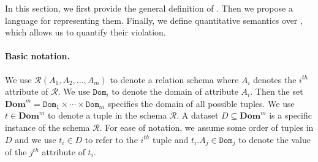 
\def\Inv{\mathtt{Inv}}
\def\Dom{\mathtt{Dom}}
\def\coDom{\mathtt{coDom}}
\def\DDom{\mathbf{Dom}}
\def\CC{\mathcal{C}}
\def\Real{{\mathbb{R}}}

\def\Bool{{\mathtt{Bool}}}
\def\true{{\mathtt{True}}}
\def\false{{\mathtt{False}}}
\def\vecw{{\vec{w}}}
\def\vecv{{\vec{v}}}
\def\lb{{\mathtt{lb}}}
\def\ub{{\mathtt{ub}}}
\def\atomic{{atomic}}
\def\Atomic{{Atomic}}
\newcommand{\semq}[1]{{[\![{#1}]\!]}}
\newcommand\avg[1]{{\mathtt{\mu}}(#1)}
\newcommand\sign[1]{{\mathtt{sign}({#1})}}
\newcommand\delF[2]{{\Delta{#1}({#2})}}
\newcommand\stddev[1]{{\mathtt{\sigma}}(#1)}
\def\monthy{M}


In this section, 
we first provide the general definition of \dis. Then we propose a language for
representing them. Finally, we define quantitative semantics over \dis, which
allows us to quantify their violation.


\smallskip

\paragraph{Basic notation.}
%
We use $\mathcal{R} (A_1, A_2, \dots, A_m)$ to denote a relation schema where
$A_i$ denotes the $i^{th}$ attribute of $\mathcal{R}$. We use $\Dom_i$ to
denote the domain of attribute $A_i$. Then the set ${\DDom}^m=\Dom_1\times
\cdots\times \Dom_m$ specifies the domain of all possible tuples. We use $t
\in\DDom^m$ to denote a tuple in the schema $\mathcal{R}$. A dataset
$D\subseteq {\DDom}^m$ is a specific instance of the schema $\mathcal{R}$. For
ease of notation, we assume some order of tuples in $D$ and we use $t_i \in D$
to refer to the $i^{th}$ tuple and $t_i.A_j \in \Dom_j$ to denote the value of
the $j^{th}$ attribute of $t_i$.

